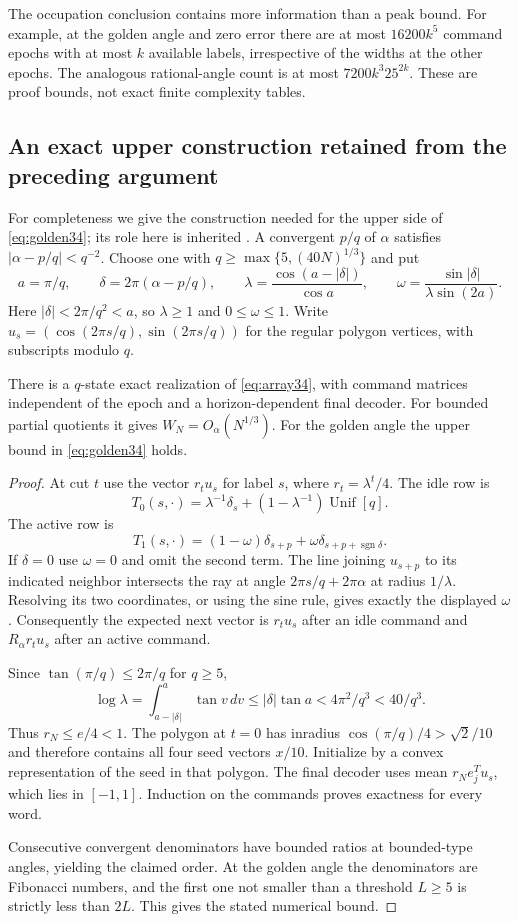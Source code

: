 The occupation conclusion contains more information than a peak bound.
For example, at the golden angle and zero error there are at most
$16200k^5$ command epochs with at most $k$ available labels, irrespective
of the widths at the other epochs. The analogous rational-angle count is
at most $7200k^3 25^{2k}$. These are proof bounds, not exact finite
complexity tables.

\subsection{An exact upper construction retained from the preceding argument}
For completeness we give the construction needed for the upper side of
\eqref{eq:golden34}; its role here is inherited \cite{GTF33}. A convergent
$p/q$ of $\alpha$ satisfies $|\alpha-p/q|<q^{-2}$. Choose one with
$q\ge\max\{5,(40N)^{1/3}\}$ and put
\[
 a=\pi/q,\qquad \delta=2\pi(\alpha-p/q),\qquad
 \lambda=\frac{\cos(a-|\delta|)}{\cos a},\qquad
 \omega=\frac{\sin|\delta|}{\lambda\sin(2a)}.
\]
Here $|\delta|<2\pi/q^2<a$, so $\lambda\ge1$ and $0\le\omega\le1$.
Write $u_s=(\cos(2\pi s/q),\sin(2\pi s/q))$ for the regular polygon
vertices, with subscripts modulo $q$.

\begin{proposition}\label{prop:upper34}
There is a $q$-state exact realization of \eqref{eq:array34}, with command
matrices independent of the epoch and a horizon-dependent final decoder.
For bounded partial quotients it gives $W_N=O_\alpha(N^{1/3})$.
For the golden angle the upper bound in \eqref{eq:golden34} holds.
\end{proposition}
\begin{proof}
At cut $t$ use the vector $r_tu_s$ for label $s$, where
$r_t=\lambda^t/4$. The idle row is
\[
 T_0(s,\cdot)=\lambda^{-1}\delta_s+(1-\lambda^{-1})\operatorname{Unif}[q].
\]
The active row is
\[
 T_1(s,\cdot)=(1-\omega)\delta_{s+p}
                  +\omega\delta_{s+p+\operatorname{sgn}\delta}.
\]
If $\delta=0$ use $\omega=0$ and omit the second term. The line joining
$u_{s+p}$ to its indicated neighbor intersects the ray at angle
$2\pi s/q+2\pi\alpha$ at radius $1/\lambda$. Resolving its two
coordinates, or using the sine rule, gives exactly the displayed $\omega$.
Consequently the expected next vector is $r_tu_s$ after an idle command
and $R_\alpha r_tu_s$ after an active command.

Since $\tan(\pi/q)\le2\pi/q$ for $q\ge5$,
\[
 \log\lambda=\int_{a-|\delta|}^a\tan v\,dv
        \le|\delta|\tan a<4\pi^2/q^3<40/q^3.
\]
Thus $r_N\le e/4<1$. The polygon at $t=0$ has inradius
$\cos(\pi/q)/4>\sqrt2/10$ and therefore contains all four seed vectors
$x/10$. Initialize by a convex representation of the seed in that polygon.
The final decoder uses mean $r_Ne_j^Tu_s$, which lies in $[-1,1]$.
Induction on the commands proves exactness for every word.

Consecutive convergent denominators have bounded ratios at bounded-type
angles, yielding the claimed order. At the golden angle the denominators
are Fibonacci numbers, and the first one not smaller than a threshold
$L\ge5$ is strictly less than $2L$. This gives the stated numerical bound.
\end{proof}

